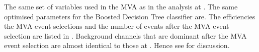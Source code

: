 The same set of variables used in the MVA as in the analysis at . The same optimised parameters for the Boosted Decision Tree classifier are. The efficiencies the MVA event selections and the number of events after the MVA event selection are listed in . Background channels that are dominant after the MVA event selection are almost identical to those at . Hence see  for discussion.

